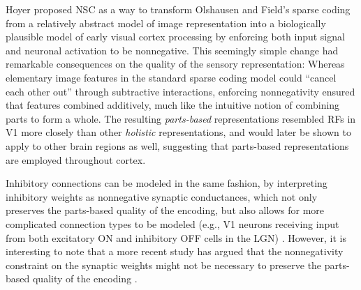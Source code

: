 Hoyer \citep{Hoyer2002,Hoyer2003} proposed \ac{NSC} as a way 
to transform Olshausen and Field's sparse coding 
from a relatively abstract model of image representation 
into a biologically plausible model of early visual cortex processing
by enforcing both input signal and neuronal activation to be nonnegative.
This seemingly simple change had remarkable consequences on the quality of the
sensory representation:
Whereas elementary image features in the standard sparse coding model could
``cancel each other out'' through subtractive interactions,
enforcing nonnegativity ensured that features combined additively,
much like the intuitive notion of combining parts to form a whole.
The resulting \emph{parts-based} representations resembled \acp{RF} in \ac{V1} more closely
than other \emph{holistic} representations,
and would later be shown to apply to other brain regions as well,
suggesting that parts-based representations are employed throughout cortex.

Inhibitory connections can be modeled in the same fashion,
by interpreting inhibitory weights as nonnegative synaptic conductances,
which not only
preserves the parts-based quality of the encoding,
but also allows for more complicated connection types to be modeled
(e.g., \ac{V1} neurons receiving input from both excitatory ON
and inhibitory OFF cells in the \ac{LGN})
\citep{Hoyer2003}.
However, it is interesting to note that a more recent study has argued
that the nonnegativity constraint on the
synaptic weights might not be necessary to preserve the parts-based quality of
the encoding \citep{Liu2017}.
